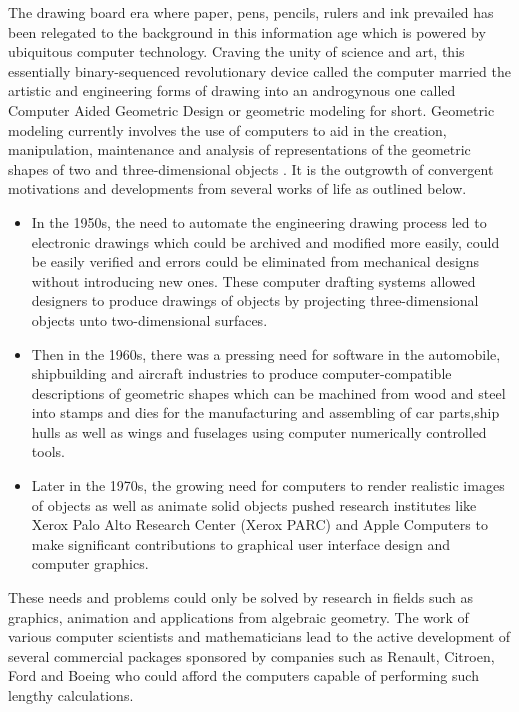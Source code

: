 \hspace{30}The drawing board era where paper, pens, pencils, rulers and ink  
prevailed has been relegated to the background in this information age which is  
powered by ubiquitous computer technology. Craving the unity of science and  
art, this essentially binary­-sequenced revolutionary device called the computer  
married the artistic and engineering forms of drawing into an androgynous one  
called Computer­ Aided Geometric Design or geometric modeling for short.
Geometric modeling currently involves the use of computers to aid in the  
creation, manipulation, maintenance and analysis of representations of the  
geometric shapes of two and three-­dimensional objects \cite{2}. It is the outgrowth  
of convergent motivations and developments from several works of life as  
outlined below.
\begin{itemize}
\item In the 1950s, the need to automate the engineering drawing process led
to electronic drawings which could be archived and modified more easily,
could be easily verified and errors could be eliminated from mechanical 
designs without introducing new ones. These computer drafting systems
allowed designers to produce drawings of objects by projecting
three-­dimensional objects unto two-­dimensional surfaces.
\item Then in the 1960s, there was a pressing need for software in the
automobile, shipbuilding and aircraft industries to produce
computer-­compatible descriptions of geometric shapes which can be
machined from wood and steel into stamps and dies for the
manufacturing and assembling of car parts,ship hulls as well as wings and  
fuselages using computer numerically controlled tools.
\item Later in the 1970s, the growing need for computers to render realistic
images of objects as well as animate solid objects pushed research
institutes like Xerox Palo Alto Research Center (Xerox PARC) and Apple
Computers to make significant contributions to graphical user­ interface
design and computer graphics.  
\end{itemize}

These needs and problems could only be solved by research in fields such as
graphics, animation and applications from algebraic geometry. The work of
various computer scientists and mathematicians lead to the active development
of several commercial packages sponsored by companies such as Renault,
Citroen, Ford and Boeing who could afford the computers capable of  
performing such lengthy calculations.  

